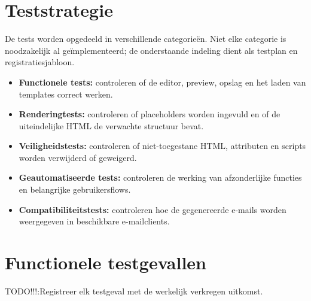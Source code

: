 \section{Teststrategie}
De tests worden opgedeeld in verschillende categorieën. Niet elke categorie
is noodzakelijk al geïmplementeerd; de onderstaande indeling dient als
testplan en registratiesjabloon.

\begin{itemize}
    \item \textbf{Functionele tests:} controleren of de editor, preview,
    opslag en het laden van templates correct werken.
    \item \textbf{Renderingtests:} controleren of placeholders worden
    ingevuld en of de uiteindelijke HTML de verwachte structuur bevat.
    \item \textbf{Veiligheidstests:} controleren of niet-toegestane HTML,
    attributen en scripts worden verwijderd of geweigerd.
    \item \textbf{Geautomatiseerde tests:} controleren de werking van
    afzonderlijke functies en belangrijke gebruikersflows.
    \item \textbf{Compatibiliteitstests:} controleren hoe de gegenereerde
    e-mails worden weergegeven in beschikbare e-mailclients.
\end{itemize}

\section{Functionele testgevallen}

TODO!!!:Registreer elk testgeval met de werkelijk verkregen uitkomst.

